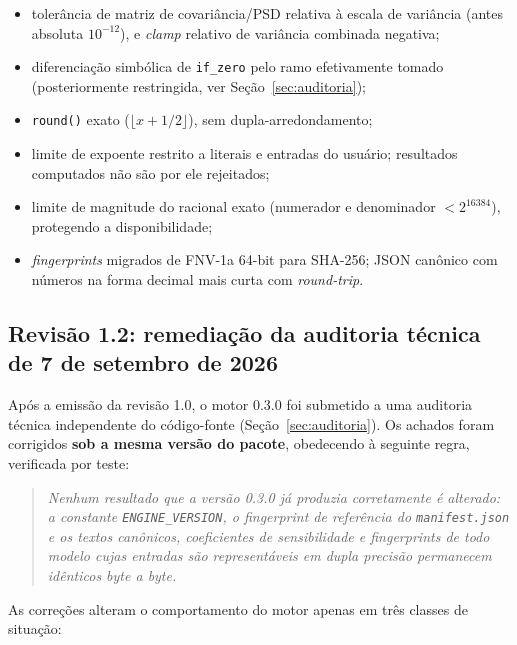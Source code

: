 \documentclass[11pt,a4paper]{article}
\newcommand{\docVersion}{0.3.0}
\newcommand{\docRevision}{1.2}
\newcommand{\auditDate}{7 de setembro de 2026}
\begin{document}
\begin{itemize}
  \item tolerância de matriz de covariância/PSD relativa à escala de variância (antes absoluta \(10^{-12}\)), e \emph{clamp} relativo de variância combinada negativa;
  \item diferenciação simbólica de \texttt{if\_zero} pelo ramo efetivamente tomado (posteriormente restringida, ver Seção~\ref{sec:auditoria});
  \item \texttt{round()} exato (\(\lfloor x + 1/2 \rfloor\)), sem dupla-arredondamento;
  \item limite de expoente restrito a literais e entradas do usuário; resultados computados não são por ele rejeitados;
  \item limite de magnitude do racional exato (numerador e denominador \(< 2^{16384}\)), protegendo a disponibilidade;
  \item \emph{fingerprints} migrados de FNV-1a 64-bit para SHA-256; JSON canônico com números na forma decimal mais curta com \emph{round-trip}.
\end{itemize}

\subsection{Revisão \docRevision{}: remediação da auditoria técnica de \auditDate}
\label{sec:rev11}

Após a emissão da revisão 1.0, o motor \docVersion{} foi submetido a uma auditoria técnica independente do código-fonte (Seção~\ref{sec:auditoria}). Os achados foram corrigidos \textbf{sob a mesma versão do pacote}, obedecendo à seguinte regra, verificada por teste:

\begin{quote}
\emph{Nenhum resultado que a versão \docVersion{} já produzia corretamente é alterado: a constante \texttt{ENGINE\_VERSION}, o \emph{fingerprint} de referência do \texttt{manifest.json} e os textos canônicos, coeficientes de sensibilidade e \emph{fingerprints} de todo modelo cujas entradas são representáveis em dupla precisão permanecem idênticos byte a byte.}
\end{quote}

As correções alteram o comportamento do motor apenas em três classes de situação:
\end{document}
